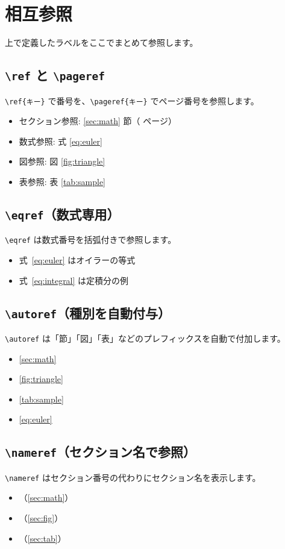 \documentclass[lualatex,ja=standard]{bxjsarticle}
\begin{document}
\section{相互参照}
\label{sec:ref}

上で定義したラベルをここでまとめて参照します。

\subsection{\texttt{\textbackslash ref} と \texttt{\textbackslash pageref}}

\texttt{\textbackslash ref\{キー\}} で番号を、\texttt{\textbackslash pageref\{キー\}} でページ番号を参照します。

\begin{itemize}
  \item セクション参照: \ref{sec:math} 節（\pageref{sec:math} ページ）
  \item 数式参照: 式 \ref{eq:euler}
  \item 図参照: 図 \ref{fig:triangle}
  \item 表参照: 表 \ref{tab:sample}
\end{itemize}

\subsection{\texttt{\textbackslash eqref}（数式専用）}

\texttt{\textbackslash eqref} は数式番号を括弧付きで参照します。

\begin{itemize}
  \item 式~\eqref{eq:euler} はオイラーの等式
  \item 式~\eqref{eq:integral} は定積分の例
\end{itemize}

\subsection{\texttt{\textbackslash autoref}（種別を自動付与）}

\texttt{\textbackslash autoref} は「節」「図」「表」などのプレフィックスを自動で付加します。

\begin{itemize}
  \item \autoref{sec:math}
  \item \autoref{fig:triangle}
  \item \autoref{tab:sample}
  \item \autoref{eq:euler}
\end{itemize}

\subsection{\texttt{\textbackslash nameref}（セクション名で参照）}

\texttt{\textbackslash nameref} はセクション番号の代わりにセクション名を表示します。

\begin{itemize}
  \item {}（\autoref{sec:math}）
  \item {}（\autoref{sec:fig}）
  \item {}（\autoref{sec:tab}）
\end{itemize}
\end{document}
